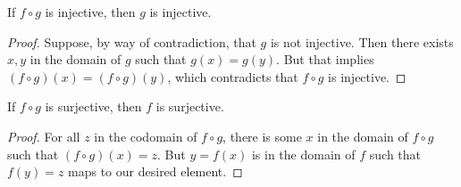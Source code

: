 \begin{proposition}\label{prop:composite-injection}
    If \(f \circ g\) is injective, then \(g\) is injective.
\end{proposition}
\begin{proof}
    Suppose, by way of contradiction, that \(g\) is not injective.
    Then there exists \(x,y\) in the domain of \(g\)
    such that \(g(x) = g(y)\).
    But that implies \((f \circ g)(x) = (f \circ g)(y)\),
    which contradicts that \(f \circ g\) is injective.
\end{proof}
\begin{proposition}\label{prop:composite-surjective}
    If \(f \circ g\) is surjective, then \(f\) is surjective.
\end{proposition}
\begin{proof}
    For all \(z\) in the codomain of \(f \circ g\),
    there is some \(x\) in the domain of \(f \circ g\)
    such that \((f \circ g)(x) = z\).
    But \(y = f(x)\) is in the domain of \(f\)
    such that \(f(y) = z\) maps to our desired element.
\end{proof}

